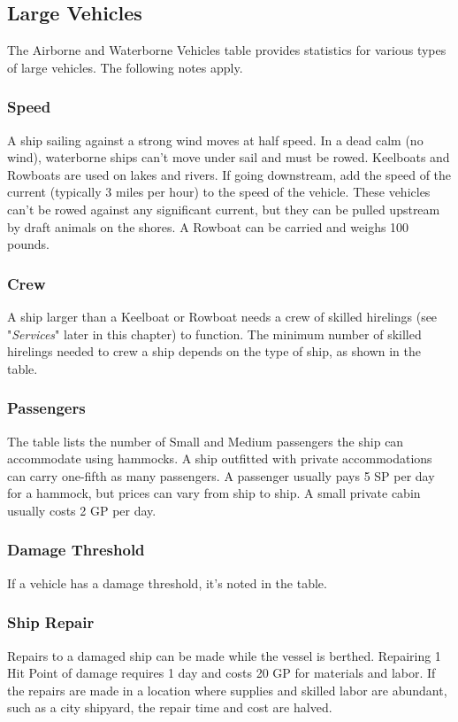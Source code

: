 \documentclass[10pt,a4paper,twoside,bg=print,twocolumn,openany,nodeprecatedcode]{dndbook}
\begin{document}
\subsection{Large Vehicles}
The Airborne and Waterborne Vehicles table provides statistics for various types of large vehicles. The following notes apply.

\subsubsection{Speed}
A ship sailing against a strong wind moves at half speed. In a dead calm (no wind), waterborne ships can't move under sail and must be rowed. Keelboats and Rowboats are used on lakes and rivers. If going downstream, add the speed of the current (typically 3 miles per hour) to the speed of the vehicle. These vehicles can't be rowed against any significant current, but they can be pulled upstream by draft animals on the shores. A Rowboat can be carried and weighs 100 pounds.

\subsubsection{Crew}
A ship larger than a Keelboat or Rowboat needs a crew of skilled hirelings (see "\textit{Services}" later in this chapter) to function. The minimum number of skilled hirelings needed to crew a ship depends on the type of ship, as shown in the table.

\subsubsection{Passengers}
The table lists the number of Small and Medium passengers the ship can accommodate using hammocks. A ship outfitted with private accommodations can carry one-fifth as many passengers. A passenger usually pays 5 SP per day for a hammock, but prices can vary from ship to ship. A small private cabin usually costs 2 GP per day.

\subsubsection{Damage Threshold}
If a vehicle has a damage threshold, it's noted in the table.

\subsubsection{Ship Repair}
Repairs to a damaged ship can be made while the vessel is berthed. Repairing 1 Hit Point of damage requires 1 day and costs 20 GP for materials and labor. If the repairs are made in a location where supplies and skilled labor are abundant, such as a city shipyard, the repair time and cost are halved.
\end{document}
